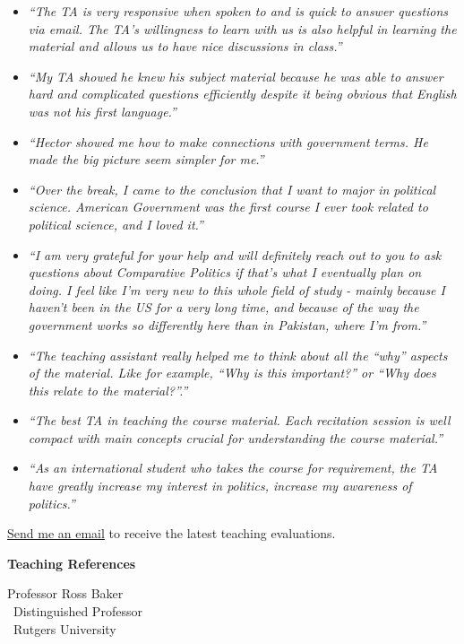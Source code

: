 \documentclass[11pt]{letter} %
\begin{document}
\begin{letter}{}
{\scriptsize
\begin{itemize}

\item \emph{``The TA is very responsive when spoken to and is quick to answer questions via email. The TA's willingness to learn with us is also helpful in learning the material and allows us to have nice discussions in class.''}

\item \emph{``My TA showed he knew his subject material because he was able to answer hard and complicated questions efficiently despite it being obvious that English was not his first language.''}

\item \emph{``Hector showed me how to make connections with government terms. He made the big picture seem simpler for me.''}

\item \emph{``Over the break, I came to the conclusion that I want to major in political science. American Government was the first course I ever took related to political science, and I loved it.''}

\item \emph{``I am very grateful for your help and will definitely reach out to you to ask questions about Comparative Politics if that's what I eventually plan on doing. I feel like I'm very new to this whole field of study - mainly because I haven't been in the US for a very long time, and because of the way the government works so differently here than in Pakistan, where I'm from.''}

\item \emph{``The teaching assistant really helped me to think about all the ``why'' aspects of the material. Like for example, ``Why is this important?'' or ``Why does this relate to the material?''.''}

\item \emph{``The best TA in teaching the course material. Each recitation session is well compact with main concepts crucial for understanding the course material.''}

\item \emph{``As an international student who takes the course for requirement, the TA have greatly increase my interest in politics, increase my awareness of politics.''}

\end{itemize}

\href{mailto:hector.bahamonde@rutgers.edu}{Send me an email} to receive the latest teaching evaluations.


}

\vspace{0.5cm}
{\bf Teaching References}

Professor Ross Baker\\\
Distinguished Professor\\\
Rutgers University






\end{letter}
\end{document}
